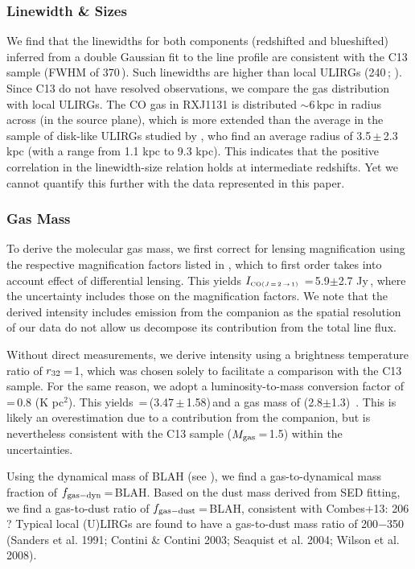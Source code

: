 \documentclass[]{emulateapj}
\begin{document}
\subsubsection{Linewidth \& Sizes}
We find that the linewidths for both components (redshifted and blueshifted)
inferred from a double Gaussian fit to the line profile are
consistent with the C13 sample (FWHM of 370\,\kms). Such linewidths are higher
than local ULIRGs (240\,\kms; \citealt[][]{Solomon97a}).
Since C13 do not have resolved observations, we compare the
gas distribution with local ULIRGs. The CO gas in RXJ1131 is
distributed $\sim$6\,kpc in radius across (in
the source plane), which is more extended than the average in the
sample of disk-like ULIRGs studied by \citet{Ueda14a},
who find an average radius of 3.5\,$\pm$\,2.3\,kpc
(with a range from 1.1 kpc to 9.3 kpc).
This indicates that the positive correlation in the linewidth-size relation
holds at intermediate redshifts. Yet we cannot quantify this further
with the data represented in this paper.

\subsubsection{Gas Mass}
To derive the molecular gas mass, we first correct for lensing magnification
using the respective magnification factors listed in , which to
first order takes into account effect of differential lensing. This yields
$I_{\tiny \mbox{CO($J$\,=\,2\,$\rightarrow$\,1) }}$\,=\,5.9$\pm$2.7 Jy\,\kms, where the uncertainty includes those on
the magnification factors.
We note that the derived intensity includes emission from the companion
as the spatial resolution of our data do not allow us decompose its contribution
from the total line flux.

Without direct  measurements,
we derive  intensity
using a brightness temperature ratio of $r_{\rm 32}$\,=\,1, which was chosen
solely to facilitate a comparison with the C13 sample. For the same reason, we
adopt a luminosity-to-mass conversion factor of
\alphaco\,=\,0.8 (K \kms pc$^2$)\pmOne. This yields
\Lp\,=\,(3.47\,$\pm$\,1.58)\,\Lsun and a gas mass
of (2.8$\pm$1.3)\, \Msun. This is likely
an overestimation due to a contribution from the companion, but is
nevertheless consistent with the C13 sample ($M_{\rm gas}$\,=\,1.5\Msun) within the
uncertainties.

Using the dynamical mass of BLAH (see ), we find
a gas-to-dynamical mass fraction of $f_{\rm gas-dyn}$\,=\,BLAH.
Based on the dust mass derived from SED fitting, we find a gas-to-dust ratio of
$f_{\rm gas-dust}$\,=\,BLAH, consistent with Combes+13: 206 ?
 Typical local (U)LIRGs are found to have a
gas-to-dust mass ratio of 200$-$350 (Sanders et al. 1991; Contini
\& Contini 2003; Seaquist et al. 2004; Wilson et al. 2008).
\end{document}
